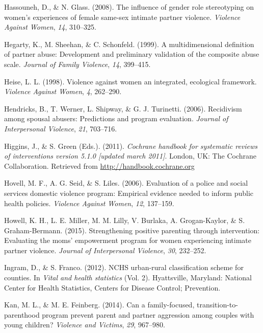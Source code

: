 \documentclass[11pt,]{tufte-book}
\begin{document}
\hypertarget{ref-hassouneh2008influence}{}
Hassouneh, D., \& N. Glass. (2008). The influence of gender role
stereotyping on women's experiences of female same-sex intimate partner
violence. \emph{Violence Against Women}, \emph{14}, 310--325.

\hypertarget{ref-hegarty1999multidimensional}{}
Hegarty, K., M. Sheehan, \& C. Schonfeld. (1999). A multidimensional
definition of partner abuse: Development and preliminary validation of
the composite abuse scale. \emph{Journal of Family Violence}, \emph{14},
399--415.

\hypertarget{ref-heise1998violence}{}
Heise, L. L. (1998). Violence against women an integrated, ecological
framework. \emph{Violence Against Women}, \emph{4}, 262--290.

\hypertarget{ref-hendricks2006recidivism}{}
Hendricks, B., T. Werner, L. Shipway, \& G. J. Turinetti. (2006).
Recidivism among spousal abusers: Predictions and program evaluation.
\emph{Journal of Interpersonal Violence}, \emph{21}, 703--716.

\hypertarget{ref-higgins2011cochrane}{}
Higgins, J., \& S. Green (Eds.). (2011). \emph{Cochrane handbook for
systematic reviews of interventions version 5.1.0 {[}updated march
2011{]}}. London, UK: The Cochrane Collaboration. Retrieved from
\url{http://handbook.cochrane.org}

\hypertarget{ref-hovell2006evaluation}{}
Hovell, M. F., A. G. Seid, \& S. Liles. (2006). Evaluation of a police
and social services domestic violence program: Empirical evidence needed
to inform public health policies. \emph{Violence Against Women},
\emph{12}, 137--159.

\hypertarget{ref-howell2015strengthening}{}
Howell, K. H., L. E. Miller, M. M. Lilly, V. Burlaka, A. Grogan-Kaylor,
\& S. Graham-Bermann. (2015). Strengthening positive parenting through
intervention: Evaluating the moms' empowerment program for women
experiencing intimate partner violence. \emph{Journal of Interpersonal
Violence}, \emph{30}, 232--252.

\hypertarget{ref-ingram2012nchs}{}
Ingram, D., \& S. Franco. (2012). NCHS urban-rural classification scheme
for counties. In \emph{Vital and health statistics} (Vol. 2).
Hyattsville, Maryland: National Center for Health Statistics, Centers
for Disease Control; Prevention.

\hypertarget{ref-kan2014can}{}
Kan, M. L., \& M. E. Feinberg. (2014). Can a family-focused,
transition-to-parenthood program prevent parent and partner aggression
among couples with young children? \emph{Violence and Victims},
\emph{29}, 967--980.
\end{document}
